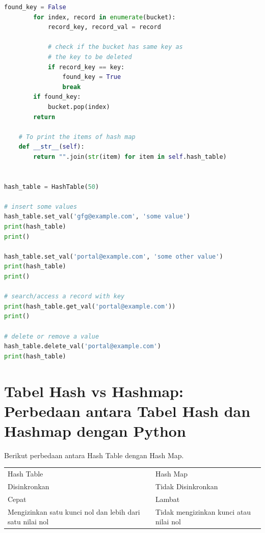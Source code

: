 \begin{lstlisting}[language=Python, caption=Implementasi Hash Map]
		found_key = False
		for index, record in enumerate(bucket):
			record_key, record_val = record
			
			# check if the bucket has same key as
			# the key to be deleted
			if record_key == key:
				found_key = True
				break
		if found_key:
			bucket.pop(index)
		return

	# To print the items of hash map
	def __str__(self):
		return "".join(str(item) for item in self.hash_table)


hash_table = HashTable(50)

# insert some values
hash_table.set_val('gfg@example.com', 'some value')
print(hash_table)
print()

hash_table.set_val('portal@example.com', 'some other value')
print(hash_table)
print()

# search/access a record with key
print(hash_table.get_val('portal@example.com'))
print()

# delete or remove a value
hash_table.delete_val('portal@example.com')
print(hash_table)

\end{lstlisting}

\section{Tabel Hash vs Hashmap: Perbedaan antara Tabel Hash dan Hashmap dengan Python}
Berikut perbedaan antara Hash Table dengan Hash Map.
\begin{table}[H]
\begin{tabular}{ll}
Hash Table                                               & Hash Map                               \\
Disinkronkan                                             & Tidak Disinkronkan                     \\
Cepat                                                    & Lambat                                 \\
Mengizinkan satu kunci nol dan lebih dari satu nilai nol & Tidak mengizinkan kunci atau nilai nol
\end{tabular}
\end{table}

